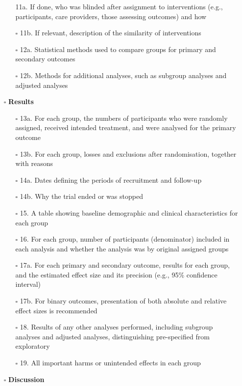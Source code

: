 \documentclass[11pt]{article}
\def\tightlist{}
\begin{document}
\begin{Form}
\begin{itemize}
\begin{itemize}
    11a. If done, who was blinded after assignment to interventions
    (e.g., participants, care providers, those assessing outcomes) and
    how
  \item[$\square$]
    11b. If relevant, description of the similarity of interventions
  \item[$\square$]
    12a. Statistical methods used to compare groups for primary and
    secondary outcomes
  \item[$\square$]
    12b. Methods for additional analyses, such as subgroup analyses and
    adjusted analyses
  \end{itemize}
\item[$\square$]
  \textbf{Results}

  \begin{itemize}
  \tightlist
  \item[$\square$]
    13a. For each group, the numbers of participants who were randomly
    assigned, received intended treatment, and were analysed for the
    primary outcome
  \item[$\square$]
    13b. For each group, losses and exclusions after randomisation,
    together with reasons
  \item[$\square$]
    14a. Dates defining the periods of recruitment and follow-up
  \item[$\square$]
    14b. Why the trial ended or was stopped
  \item[$\square$]
    15. A table showing baseline demographic and clinical
    characteristics for each group
  \item[$\square$]
    16. For each group, number of participants (denominator) included in
    each analysis and whether the analysis was by original assigned
    groups
  \item[$\square$]
    17a. For each primary and secondary outcome, results for each group,
    and the estimated effect size and its precision (e.g., 95\%
    confidence interval)
  \item[$\square$]
    17b. For binary outcomes, presentation of both absolute and relative
    effect sizes is recommended
  \item[$\square$]
    18. Results of any other analyses performed, including subgroup
    analyses and adjusted analyses, distinguishing pre-specified from
    exploratory
  \item[$\square$]
    19. All important harms or unintended effects in each group
  \end{itemize}
\item[$\square$]
  \textbf{Discussion}


\end{itemize}
\end{Form}
\end{document}
